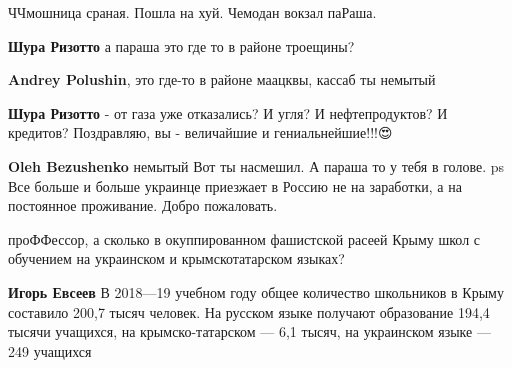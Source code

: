 \begin{itemize}


ЧЧмошница сраная. Пошла на хуй. Чемодан вокзал паРаша.

\begin{itemize}

\textbf{Шура Ризотто} а параша это где то в районе троещины?


\textbf{Andrey Polushin}, это где-то в районе маацквы, кассаб ты немытый


\textbf{Шура Ризотто} - от газа уже отказались? И угля? И нефтепродуктов? И кредитов? Поздравляю, вы - величайшие и гениальнейшие!!!😍


\textbf{Oleh Bezushenko} немытый \Smiley[1.0][yellow] Вот ты насмешил. А параша то у тебя в голове.
ps Все больше и больше украинце приезжает в Россию не на заработки, а на постоянное проживание. Добро пожаловать.
\end{itemize}


проФФессор, а сколько в окуппированном фашистской расеей Крыму школ с обучением
на украинском и крымскотатарском языках?

\begin{itemize}

\textbf{Игорь Евсеев} В 2018—19 учебном году общее количество школьников в Крыму составило 200,7 тысяч человек. На русском языке получают образование 194,4 тысячи учащихся, на крымско-татарском — 6,1 тысяч, на украинском языке — 249 учащихся



\end{itemize}
\end{itemize}
